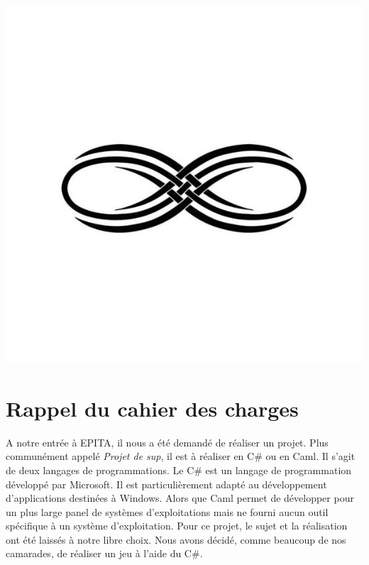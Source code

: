 \documentclass[12pt]{article}
\begin{document}
\begin{center}
\includegraphics[scale=00.20]{infini}
\end{center}


\setlength{\headheight}{13pt} %
\setlength{\headsep}{2.5cm} %
\setlength{\footskip}{2.5cm}



\setcounter{tocdepth}{1} 

\newpage
\thispagestyle{empty}
\pagestyle{fancyplain} \chead{} 
\setcounter{tocdepth}{1} 
\tableofcontents


\newpage
\setcounter{page}{1} 


\section{Rappel du cahier des charges}

A notre entrée à EPITA, il nous a été demandé de réaliser un projet. Plus communément appelé \textit{Projet de sup}, il est à réaliser en C\# ou en Caml. Il s'agit de deux langages de programmations. Le C\# est un langage de programmation développé par Microsoft. Il est particulièrement adapté au développement d'applications destinées à Windows. Alors que Caml permet de développer pour un plus large panel de systèmes d'exploitations mais ne fourni aucun outil spécifique à un système d'exploitation. Pour ce projet, le sujet et la réalisation ont été laissés à notre libre choix. Nous avons décidé, comme beaucoup de nos camarades, de réaliser un jeu à l'aide du C\#.
\end{document}

